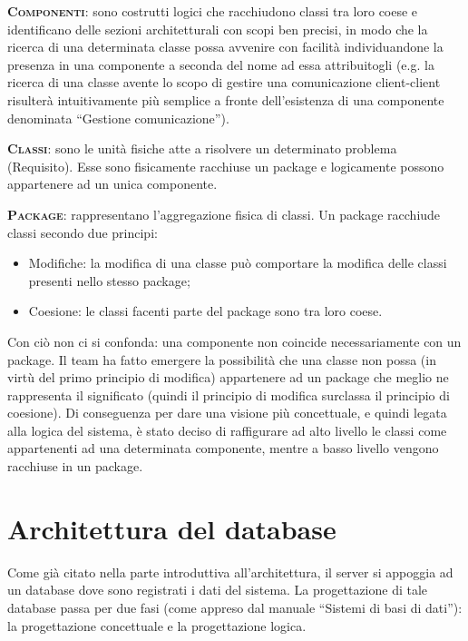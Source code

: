 \begin{description}
	\item{\scshape\bfseries Componenti}: sono costrutti logici che racchiudono classi tra loro coese e identificano delle sezioni architetturali con scopi ben precisi, in modo che la ricerca di una determinata classe possa avvenire con facilità individuandone la presenza in una componente a seconda del nome ad essa attribuitogli (e.g. la ricerca di una classe avente lo scopo di gestire una comunicazione client-client risulterà intuitivamente più semplice a fronte dell'esistenza di una componente denominata ``Gestione comunicazione'').
	\item{\scshape\bfseries Classi}: sono le unità fisiche atte a risolvere un determinato problema (Requisito). Esse sono fisicamente racchiuse un package e logicamente possono appartenere ad un unica componente.
	\item{\scshape\bfseries Package}: rappresentano l'aggregazione fisica di classi. Un package racchiude classi secondo due principi:
		\begin{itemize}
			\item Modifiche: la modifica di una classe può comportare la modifica delle classi presenti nello stesso package;
			\item Coesione: le classi facenti parte del package sono tra loro coese.
		\end{itemize}
		
		Con ciò non ci si confonda: una componente non coincide necessariamente con un package. Il team ha fatto emergere la possibilità che una classe non possa (in virtù del primo principio di modifica) appartenere ad un package che meglio ne rappresenta il significato (quindi il principio di modifica surclassa il principio di coesione). Di conseguenza per dare una visione più concettuale, e quindi legata alla logica del sistema, è stato deciso di raffigurare ad alto livello le classi come appartenenti ad una determinata componente, mentre a basso livello vengono racchiuse in un package.
\end{description}

\clearpage

\section{Architettura del database}\label{sec:database}

Come già citato nella parte introduttiva all'architettura, il server si appoggia ad un database dove sono registrati i dati del sistema. La progettazione di tale database passa per due fasi (come appreso dal manuale ``Sistemi di basi di dati''): la progettazione concettuale e la progettazione logica.

